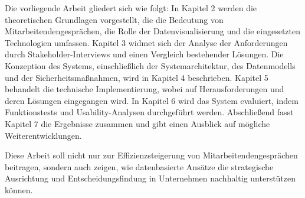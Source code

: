 Die vorliegende Arbeit gliedert sich wie folgt: 
In Kapitel 2 werden die theoretischen Grundlagen vorgestellt, die die Bedeutung von Mitarbeitendengesprächen, die Rolle der Datenvisualisierung und die eingesetzten Technologien umfassen. Kapitel 3 widmet sich der Analyse der Anforderungen durch Stakeholder-Interviews und einen Vergleich bestehender Lösungen. Die Konzeption des Systems, einschließlich der Systemarchitektur, des Datenmodells und der Sicherheitsmaßnahmen, wird in Kapitel 4 beschrieben. Kapitel 5 behandelt die technische Implementierung, wobei auf Herausforderungen und deren Lösungen eingegangen wird. In Kapitel 6 wird das System evaluiert, indem Funktionstests und Usability-Analysen durchgeführt werden. Abschließend fasst Kapitel 7 die Ergebnisse zusammen und gibt einen Ausblick auf mögliche Weiterentwicklungen.

Diese Arbeit soll nicht nur zur Effizienzsteigerung von Mitarbeitendengesprächen beitragen, sondern auch zeigen, wie datenbasierte Ansätze die strategische Ausrichtung und Entscheidungsfindung in Unternehmen nachhaltig unterstützen können.